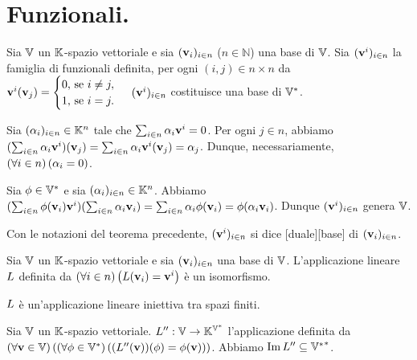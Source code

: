 \section{Funzionali.}\label{Funzionali}
\begin{Theorem}
	Sia $\mathbb{V}$ un $\mathbb{K}$-spazio vettoriale e sia $(\mathbf{v}_i)_{i \in n}$ ($n \in \mathbb{N}$)
	una base di $\mathbb{V}$. Sia $(\mathbf{v}^i)_{i \in n}$ la famiglia
	di funzionali definita, per ogni $(i,j) \in n \times n$ da
	$\mathbf{v}^i(\mathbf{v}_j) =
	\begin{cases}
		0\text{, se }i \neq j,\\
		1\text{, se }i = j.
	\end{cases}$
	$(\mathbf{v}^i)_{i \in n}$ costituisce una base di
	${{\mathbb{V}}^*}$.
\end{Theorem}
\Proof Sia $(\alpha_i)_{i \in n} \in \mathbb{K}^n$ tale che
$\sum_{i \in n} \alpha_i \mathbf{v}^i = 0$. Per ogni $j \in n$, abbiamo
$(\sum_{i \in n} \alpha_i \mathbf{v}^i)(\mathbf{v}_j) =
\sum_{i \in n} \alpha_i \mathbf{v}^i(\mathbf{v}_j) =
\alpha_j$. Dunque, necessariamente, $\left ( \forall i \in n \right ) \left ( \alpha_i = 0 \right )$.
\par Sia $\phi \in {{\mathbb{V}}^*}$ e sia $(\alpha_i)_{i \in n} \in \mathbb{K}^n$.
Abbiamo
$(\sum_{i \in n} \phi(\mathbf{v}_i)\mathbf{v}^i)
(\sum_{i \in n} \alpha_i\mathbf{v}_i)
= \sum_{i \in n} \alpha_i \phi(\mathbf{v}_i)
= \phi(\alpha_i \mathbf{v}_i)$. Dunque $(\mathbf{v}^i)_{i \in n}$
genera $\mathbb{V}$. \EndProof
\begin{Definition}
	Con le notazioni del teorema precedente,
	$(\mathbf{v}^i)_{i \in n}$ si dice
	[duale][base] di $(\mathbf{v}_i)_{i \in n}$.
\end{Definition}
\begin{Theorem}
	Sia $\mathbb{V}$ un $\mathbb{K}$-spazio vettoriale e sia $(\mathbf{v}_i)_{i \in n}$
	una base di $\mathbb{V}$. L'applicazione lineare $L$ definita
	da $\left ( \forall i \in n \right ) \left ( L(\mathbf{v}_i) = \mathbf{v}^i \right )$ \`e un isomorfismo.
\end{Theorem}
\Proof $L$ \`e un'applicazione lineare iniettiva tra spazi finiti. \EndProof
\begin{Lemma}
	Sia $\mathbb{V}$ un $\mathbb{K}$-spazio vettoriale. $L'': \mathbb{V} \rightarrow \mathbb{K}^{{\mathbb{V}}^*}$ l'applicazione definita da $\left ( \forall \mathbf{v} \in \mathbb{V} \right ) \left ( \left ( \forall \phi \in {{\mathbb{V}}^*} \right ) \left ( {(L''(\mathbf{v}))(\phi) = \phi(\mathbf{v})} \right ) \right )$. Abbiamo $\operatorname{Im}{L''} \subseteq {{{{\mathbb{V}}^*}}^*}$.
\end{Lemma}
